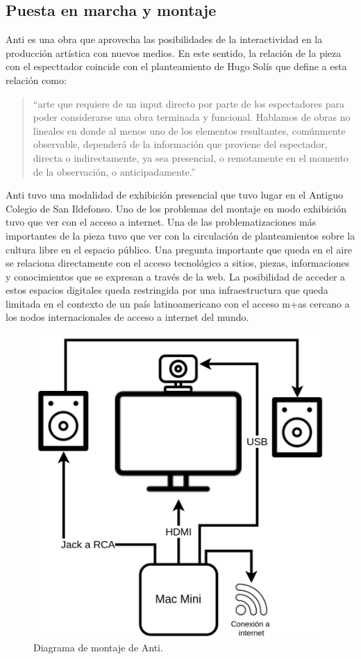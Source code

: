 \subsection{Puesta en marcha y montaje}

Anti es una obra que aprovecha las posibilidades de la interactividad en la producción artística con nuevos medios. En este sentido, la relación de la pieza con el especttador coincide con el planteamiento de Hugo Solís que define a esta relación como:

\begin{quote}

``arte que requiere de un input directo por parte de los espectadores para poder considerarse una obra terminada y funcional. Hablamos de obras no lineales en donde al menos uno de los elementos resultantes, comúnmente observable, dependerá de la información que proviene del espectador, directa o indirectamente, ya sea presencial, o remotamente en el momento de la observación, o anticipadamente.''\citep[p.~37]{hugoSolis}

\end{quote}
  
Anti tuvo una modalidad de exhibición presencial que tuvo lugar en el Antiguo Colegio de San Ildefonso. Uno de los problemas del montaje en modo exhibición tuvo que ver con el acceso a internet. Una de las problematizaciones más importantes de la pieza tuvo que ver con la circulación de planteamientos sobre la cultura libre en el espacio público. Una pregunta importante que queda en el aire se relaciona directamente con el acceso tecnológico a sitios, piezas, informaciones y conocimientos que se expresan a través de la web. La posibilidad de acceder a estos espacios digitales queda restringida por una infraestructura que queda limitada en el contexto de un país latinoamericano con el acceso m+as cercano a los nodos internacionales de acceso a internet del mundo. 

\begin{figure}[tb]
\centering 
\includegraphics[width=0.7\columnwidth]{../../img/antiExWhite.png} 
\caption[Diagrama de Montaje Anti]{Diagrama de montaje de Anti.} %
\label{fig:gallery} 
\end{figure}

